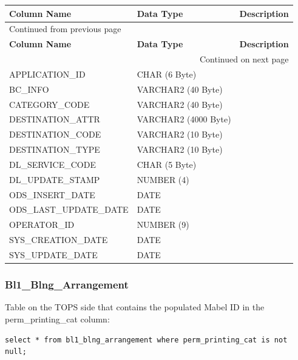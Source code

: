 \documentclass[12pt,twoside]{article}
\begin{document}
\begin{longtable}{l|l|l}
\hline
\textbf{Column Name} & \textbf{Data Type} & \textbf{Description}\\
\hline
\endfirsthead
\multicolumn{3}{l}{Continued from previous page} \\
\hline

\textbf{Column Name} & \textbf{Data Type} & \textbf{Description} \\

\hline
\endhead
\hline\multicolumn{3}{r}{Continued on next page} \\
\endfoot
\endlastfoot
\hline
APPLICATION\_ID & CHAR (6 Byte) & \\
BC\_INFO & VARCHAR2 (40 Byte) & \\
CATEGORY\_CODE & VARCHAR2 (40 Byte) & \\
DESTINATION\_ATTR & VARCHAR2 (4000 Byte) & \\
DESTINATION\_CODE & VARCHAR2 (10 Byte) & \\
DESTINATION\_TYPE & VARCHAR2 (10 Byte) & \\
DL\_SERVICE\_CODE & CHAR (5 Byte) & \\
DL\_UPDATE\_STAMP & NUMBER (4) & \\
ODS\_INSERT\_DATE & DATE & \\
ODS\_LAST\_UPDATE\_DATE & DATE & \\
OPERATOR\_ID & NUMBER (9) & \\
SYS\_CREATION\_DATE & DATE & \\
SYS\_UPDATE\_DATE & DATE & \\
\hline
\end{longtable}
\normalsize

\subsubsection{Bl1\_Blng\_Arrangement}
\label{sec:orgheadline144}
Table on the TOPS side that contains the populated Mabel ID in the perm\_printing\_cat column:
\begin{verbatim}
select * from bl1_blng_arrangement where perm_printing_cat is not null;
\end{verbatim}
\end{document}
